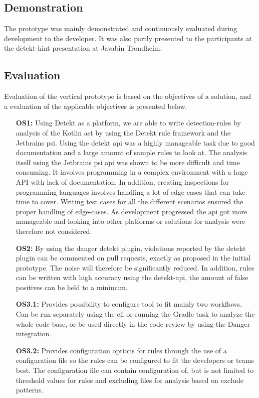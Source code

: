 \documentclass{report}
\begin{document}
\subsection*{Demonstration}
The prototype was mainly demonstrated and continuously evaluated during development to the developer. It was also partly presented to the participants at the detekt-hint presentation at Javabin Trondheim.

\subsection*{Evaluation}
Evaluation of the vertical prototype is based on the objectives of a solution, and a evaluation of the applicable objectives is presented below.
\begin{itemize}
    \item [\textbf{OS1:}] Using Detekt as a platform, we are able to write detection-rules by analysis of the Kotlin \gls{ast} by using the Detekt rule framework and the  Jetbrains \gls{psi}. Using the detekt \gls{api} was a highly manageable task due to good documentation and a large amount of sample rules to look at. The analysis itself using the Jetbrains \gls{psi} \gls{api} was shown to be more difficult and time consuming. It involves programming in a complex environment with a huge API with lack of documentation. In addition, creating inspections for programming languages involves handling a lot of edge-cases that can take time to cover. Writing test cases for all the different scenarios ensured the proper handling of edge-cases. As development progressed the \gls{api} got more manageable and looking into other platforms or solutions for analysis were therefore not considered.   
    
    \item [\textbf{OS2:}] By using the danger detekt plugin, violations reported by the detekt plugin can be commented on pull requests, exactly as proposed in the initial prototype. The noise will therefore be significantly reduced. In addition, rules can be written with high accuracy using the detekt-api, the amount of false positives can be held to a minimum. 
    
    \item [\textbf{OS3.1:}] Provides possibility to configure tool to fit mainly two workflows. Can be run separately using the \gls{cli} or running the Gradle task to analyze the whole code base, or be used directly in the code review by using the Danger integration.
    \item [\textbf{OS3.2:}] Provides configuration options for rules through the use of a configuration file so the rules can be configured to fit the developers or teams best. The configuration file can contain configuration of, but is not limited to threshold values for rules and excluding files for analysis based on exclude patterns. 
    

\end{itemize}
\end{document}
